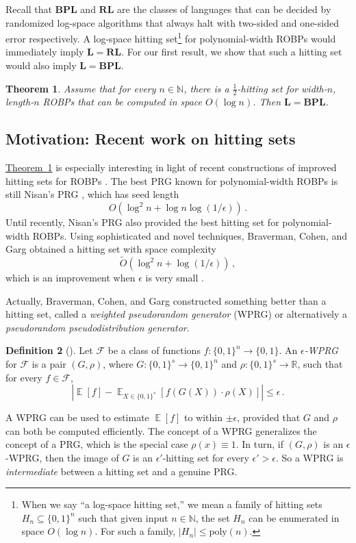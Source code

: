 \documentclass[11pt]{article}
\numberwithin{equation}{section}
\newtheorem{theorem}{Theorem}[section]
\theoremstyle{definition}
\newtheorem{definition}[theorem]{Definition}
\theoremstyle{plain}
\newcommand{\R}{\mathbb R}
\newcommand{\N}{\mathbb N}
\newcommand{\expref}[2]{\hyperref[#2]{#1~\ref{#2}}}
\DeclareMathOperator*{\ExpVal}{\mathbb{E}}
\begin{document}
Recall that $\mathbf{BPL}$ and $\mathbf{RL}$ are the classes of languages that can be decided by randomized log-space algorithms that always halt with two-sided and one-sided error respectively. A log-space hitting set\footnote{When we say ``a log-space hitting set,'' we mean a family of hitting sets $H_n \subseteq \{0, 1\}^n$ such that given input $n \in \N$, the set $H_n$ can be enumerated in space $O(\log n)$. For such a family, $|H_n| \leq \text{poly}(n)$.} for polynomial-width ROBPs would immediately imply $\mathbf{L} = \mathbf{RL}$. For our first result, we show that such a hitting set would also imply $\mathbf{L}= \mathbf{BPL}$.

\begin{theorem} \label{thm:poly-width-main}
Assume that for every $n \in \N$, there is a $\frac{1}{2}$-hitting set for width-$n$, length-$n$ ROBPs that can be computed in space $O(\log n)$. Then $\mathbf{L} = \mathbf{BPL}$.
\end{theorem}

\subsection{Motivation: Recent work on hitting sets}

\expref{Theorem}{thm:poly-width-main} is especially interesting in light of recent constructions of improved hitting sets for ROBPs \cite{BCG20, HZ20, CL20}. The best PRG known for polynomial-width ROBPs is still Nisan's PRG \cite{Nis92}, which has seed length
$$
O(\log^2 n + \log n \log(1/\epsilon))\,.
$$
Until recently, Nisan's PRG also provided the best hitting set for polynomial-width ROBPs. Using sophisticated and novel techniques, Braverman, Cohen, and Garg obtained a hitting set with space complexity
$$
\widetilde{O}(\log^2 n + \log(1/\epsilon))\,,
$$
which is an improvement when $\epsilon$ is very small \cite{BCG20}.

Actually, Braverman, Cohen, and Garg constructed something better than a hitting set, called a \emph{weighted pseudorandom generator} (WPRG) or alternatively a \emph{pseudorandom pseudodistribution generator}.
\begin{definition}[\cite{BCG20}]
Let $\mathcal{F}$ be a class of functions $f \colon \{0, 1\}^n \to \{0, 1\}$. An \emph{$\epsilon$-WPRG} for $\mathcal{F}$ is a pair $(G, \rho)$, where $G \colon \{0, 1\}^s \to \{0, 1\}^n$ and $\rho \colon \{0, 1\}^s \to \R$, such that for every $f \in \mathcal{F}$,
\[
\left|\ExpVal[f] - \ExpVal_{X \in \{0, 1\}^s}[f(G(X)) \cdot \rho(X)]\right| \leq \epsilon\,.
\]
\end{definition}
A WPRG can be used to estimate $\ExpVal[f]$ to within $\pm \epsilon$, provided that $G$ and $\rho$ can both be computed efficiently. The concept of a WPRG generalizes the concept of a PRG, which is the special case $\rho(x) \equiv 1$. 
In turn, if $(G, \rho)$ is an $\epsilon$-WPRG, then the image of $G$ is an $\epsilon'$-hitting set for every $\epsilon' > \epsilon$. So a WPRG is \emph{intermediate} between a hitting set and a genuine PRG.
\end{document}
